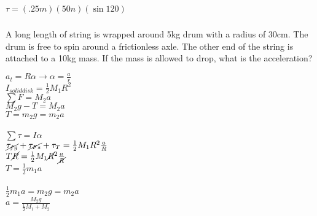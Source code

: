 \documentclass{article}
\begin{document}
        \begingroup
        \centering

        $\tau = (.25m)(50n)(\sin120)$ \\[10pt]

        \endgroup

        \hrulefill

        \subsubsection{}
            A long length of string is wrapped around 5kg drum with a radius of 30cm. The drum is free to spin around a frictionless axle. The other end of the string is attached to a 10kg mass. If the mass is allowed to drop, what is the acceleration?

            $a_t = R \alpha \rightarrow \alpha = \frac{a}{r}$\\ [10pt]
            $I_{soliddisk} = \frac{1}{2} M_1R^2$ \\ [10pt]
            $\sum F = M_2a$  \\ [10pt]
            $M_2g - T = M_2a$\\[10pt]
            $T = m_2g = m_2a$ \\[10pt]
            \hrulefill \\[10pt]
            $\sum\tau = I \alpha$\\[10pt]
            $\cancel{\tau_{fg}} + \cancel{\tau_{Fs}} + \tau_T = \frac{1}{2} M_1R^2\frac{a}{R}$ \\ [10pt]
            $T\cancel{R} = \frac{1}{2} M_1\cancel{R}^2\frac{a}{\cancel{R}}$\\[10pt]
            $T = \frac{1}{2} m_1a$ \\[20pt]
            \hrulefill \\[10pt]
            $\frac{1}{2} m_1a = m_2g = m_2a $ \\ [15pt]

            $a = \frac{M_2g}{\frac{1}{2}M_1 +M_2}$ \\[20pt]
\end{document}
